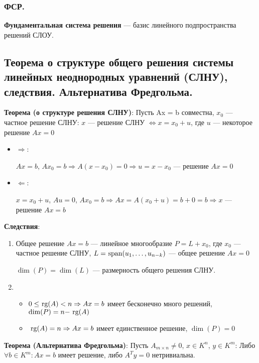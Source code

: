\subsubsection{ФСР.}
\textbf{Фундаментальная система решения} --- базис линейного подпространства решений СЛОУ.


\subsection{Теорема о структуре общего решения системы линейных неоднородных уравнений
(СЛНУ), следствия. Альтернатива Фредгольма.}
\textbf{Теорема (о структуре решения СЛНУ)}: Пусть Ax = b совместна, \(x_0\) --- частное решение СЛНУ: \(x\) --- решение СЛНУ \(\Leftrightarrow x = x_0 + u\), где \(u\) --- некоторое решение \(Ax = 0\)
\begin{itemize}
    \item \(\Rightarrow\):

          \(Ax = b\), \(Ax_0 = b \Rightarrow A(x - x_0) = 0 \Rightarrow u = x - x_0\) --- решение \(Ax = 0\)

    \item \(\Leftarrow\):

          \(x = x_0 + u\), \(Au = 0\), \(Ax_0 = b \Rightarrow Ax = A(x_0 + u) = b + 0 = b \Rightarrow x\) --- решение \(Ax = b\)
\end{itemize}
\textbf{Следствия}:
\begin{enumerate}
    \item Общее решение \(Ax = b\) --- линейное многообразие \(P = L + x_0\), где \(x_0\) --- частное решение СЛНУ, \(L = \spann(u_1, \ldots, u_{n-k})\) --- общее решение \(Ax = 0\)

          \(\dim(P) = \dim(L)\) --- размерность общего решения СЛНУ.

    \item
          \begin{itemize}
              \item \(0 \leq \rg(A) < n \Rightarrow Ax = b\) имеет бесконечно много решений, \(\dim(P) = n - \rg(A)\)

              \item \(\rg(A) = n \Rightarrow Ax = b\) имеет единственное решение, \(\dim(P) = 0\)
          \end{itemize}
\end{enumerate}


\textbf{Теорема (Альтернатива Фредгольма)}: Пусть \(A_{m\times n} \neq 0\), \(x \in K^n\), \(y \in K^m\): Либо \(\forall b \in K^m: Ax = b\) имеет решение, либо \(A^Ty = 0\) нетривиальна.

